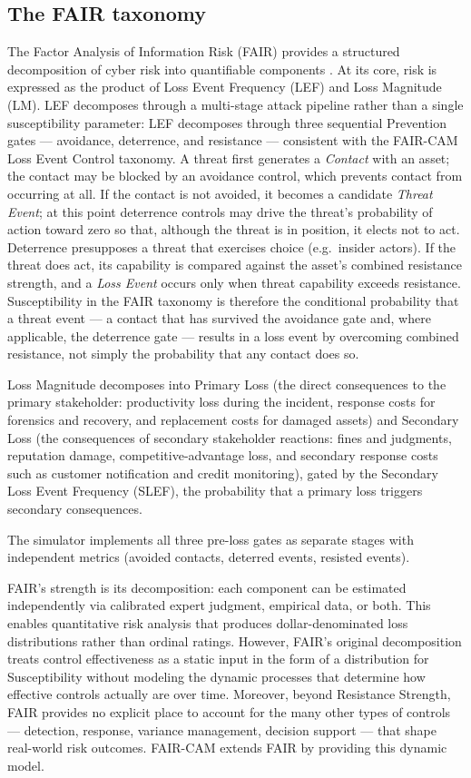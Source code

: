 \documentclass[11pt,a4paper]{article}
\begin{document}
\subsection{The FAIR taxonomy}

The Factor Analysis of Information Risk (FAIR) provides a structured decomposition of cyber risk into quantifiable components \citep{Freund2015}. At its core, risk is expressed as the product of Loss Event Frequency (LEF) and Loss Magnitude (LM). LEF decomposes through a multi-stage attack pipeline rather than a single susceptibility parameter: LEF decomposes through three sequential Prevention gates --- avoidance, deterrence, and resistance --- consistent with the FAIR-CAM Loss Event Control taxonomy. A threat first generates a \emph{Contact} with an asset; the contact may be blocked by an avoidance control, which prevents contact from occurring at all. If the contact is not avoided, it becomes a candidate \emph{Threat Event}; at this point deterrence controls may drive the threat's probability of action toward zero so that, although the threat is in position, it elects not to act. Deterrence presupposes a threat that exercises choice (e.g.\ insider actors). If the threat does act, its capability is compared against the asset's combined resistance strength, and a \emph{Loss Event} occurs only when threat capability exceeds resistance. Susceptibility in the FAIR taxonomy is therefore the conditional probability that a threat event --- a contact that has survived the avoidance gate and, where applicable, the deterrence gate --- results in a loss event by overcoming combined resistance, not simply the probability that any contact does so.

Loss Magnitude decomposes into Primary Loss (the direct consequences to the primary stakeholder: productivity loss during the incident, response costs for forensics and recovery, and replacement costs for damaged assets) and Secondary Loss (the consequences of secondary stakeholder reactions: fines and judgments, reputation damage, competitive-advantage loss, and secondary response costs such as customer notification and credit monitoring), gated by the Secondary Loss Event Frequency (SLEF), the probability that a primary loss triggers secondary consequences.

The simulator implements all three pre-loss gates as separate stages with independent metrics (avoided contacts, deterred events, resisted events).

FAIR's strength is its decomposition: each component can be estimated independently via calibrated expert judgment, empirical data, or both. This enables quantitative risk analysis that produces dollar-denominated loss distributions rather than ordinal ratings. However, FAIR's original decomposition treats control effectiveness as a static input in the form of a distribution for Susceptibility without modeling the dynamic processes that determine how effective controls actually are over time. Moreover, beyond Resistance Strength, FAIR provides no explicit place to account for the many other types of controls --- detection, response, variance management, decision support --- that shape real-world risk outcomes. FAIR-CAM extends FAIR by providing this dynamic model.
\end{document}
